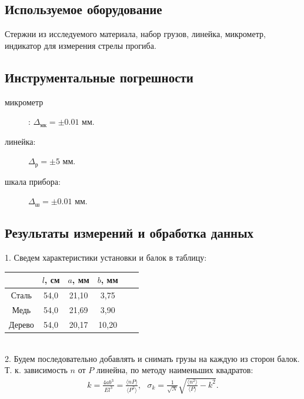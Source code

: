 \documentclass[a4paper]{article}
\begin{document}
\subsection{Используемое оборудование}
Стержни из исследуемого материала, набор грузов, линейка, микрометр, индикатор для измерения стрелы прогиба.

\subsection{Инструментальные погрешности}

\begin{description}
    \item[микрометр]: $\Delta_\text{мк} = \pm 0.01$ мм.
    \item[линейка:] $\Delta_\text{р}=\pm5$ мм.
    \item[шкала прибора:] $\Delta_\text{ш}=\pm0.01$ мм.
\end{description}

\subsection{Результаты измерений и обработка данных}
1. Сведем характеристики установки и балок в таблицу:
\begin{table}[!h]
\centering
\begin{tabular}{|c|c|c|c|c|c|}
\hline
& $l$, см & $a$, мм & $b$, мм \\
\hline
Сталь & 54,0 & 21,10 & 3,75\\
\hline
Медь & 54,0 & 21,69 & 3,90\\
\hline
Дерево & 54,0 & 20,17 & 10,20\\
\hline
\end{tabular}
\end{table} \\
2. Будем последовательно добавлять и снимать грузы на каждую из сторон балок.\\

\noindent Т. к. зависимость $n$ от $P$ линейна, по методу наименьших квадратов:
\[
\begin{gathered}
k = \frac{4ab^3}{El^3} = \frac{\langle nP \rangle}{\langle P^2 \rangle},  \text{ } \sigma_k = \frac{1}{\sqrt{N}}\sqrt{\frac{ \langle n^2 \rangle }{ \langle P \rangle } - k^2}.
\end{gathered}
\]
\end{document}
